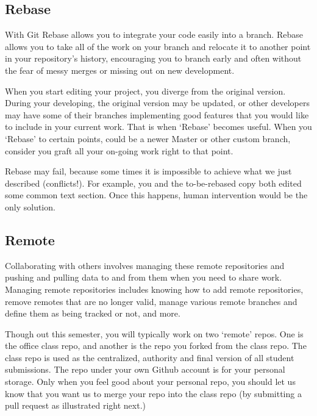 \subsection{Rebase}\label{rebase}

With Git Rebase allows you to integrate your code easily into a branch.
Rebase allows you to take all of the work on your branch and relocate it
to another point in your repository's history, encouraging you to branch
early and often without the fear of messy merges or missing out on new
development.

When you start editing your project, you diverge from the original
version. During your developing, the original version may be updated, or
other developers may have some of their branches implementing good
features that you would like to include in your current work. That is
when `Rebase' becomes useful. When you `Rebase' to certain points, could
be a newer Master or other custom branch, consider you graft all your
on-going work right to that point.

Rebase may fail, because some times it is impossible to achieve what we
just described (conflicts!). For example, you and the to-be-rebased copy
both edited some common text section. Once this happens, human
intervention would be the only solution.


\subsection{Remote}\label{remote}

Collaborating with others involves managing these remote repositories
and pushing and pulling data to and from them when you need to share
work. Managing remote repositories includes knowing how to add remote
repositories, remove remotes that are no longer valid, manage various
remote branches and define them as being tracked or not, and more.

Though out this semester, you will typically work on two `remote' repos.
One is the office class repo, and another is the repo you forked from
the class repo. The class repo is used as the centralized, authority and
final version of all student submissions. The repo under your own Github
account is for your personal storage. Only when you feel good about your
personal repo, you should let us know that you want us to merge your
repo into the class repo (by submitting a pull request as illustrated
right next.)

